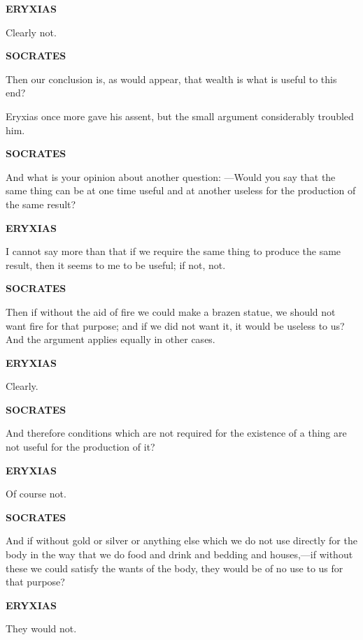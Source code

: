\documentclass[11pt,letter]{article}
\begin{document}
\par \textbf{ERYXIAS}
\par   Clearly not.

\par \textbf{SOCRATES}
\par   Then our conclusion is, as would appear, that wealth is what is useful to this end?

\par  Eryxias once more gave his assent, but the small argument considerably troubled him.

\par \textbf{SOCRATES}
\par   And what is your opinion about another question: —Would you say that the same thing can be at one time useful and at another useless for the production of the same result?

\par \textbf{ERYXIAS}
\par   I cannot say more than that if we require the same thing to produce the same result, then it seems to me to be useful; if not, not.

\par \textbf{SOCRATES}
\par   Then if without the aid of fire we could make a brazen statue, we should not want fire for that purpose; and if we did not want it, it would be useless to us? And the argument applies equally in other cases.

\par \textbf{ERYXIAS}
\par   Clearly.

\par \textbf{SOCRATES}
\par   And therefore conditions which are not required for the existence of a thing are not useful for the production of it?

\par \textbf{ERYXIAS}
\par   Of course not.

\par \textbf{SOCRATES}
\par   And if without gold or silver or anything else which we do not use directly for the body in the way that we do food and drink and bedding and houses,—if without these we could satisfy the wants of the body, they would be of no use to us for that purpose?

\par \textbf{ERYXIAS}
\par   They would not.
\end{document}
